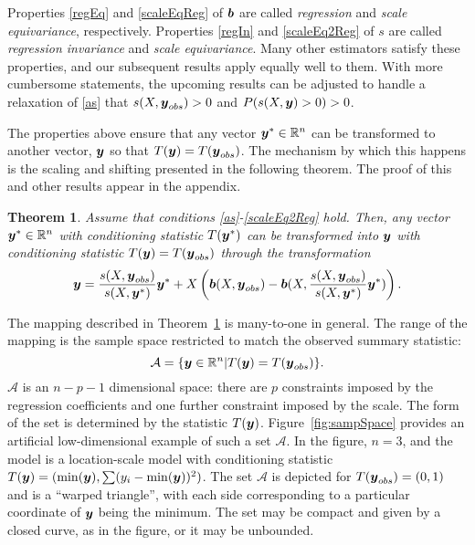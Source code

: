 \documentclass[12pt]{article}
\newcommand{\by}{\mbox{\boldmath $y$}}
\newcommand{\bb}{\mbox{\boldmath $b$}}
\newtheorem{theorem}{Theorem}[section]
\begin{document}
Properties \ref{regEq} and \ref{scaleEqReg} of $\bb$ are called
\textit{regression} and \textit{scale equivariance},
respectively.  Properties \ref{regIn} and \ref{scaleEq2Reg} of $s$ are called \textit{regression invariance}
and \textit{scale equivariance}. 
Many other estimators satisfy these properties, and our subsequent results apply equally
well to them.  With more cumbersome statements, the upcoming results can be adjusted to handle 
a relaxation of \ref{as} that 
$s(X,\by_{obs}) > 0$ and $P(s(X,\by)>0)>0$.  

The properties above ensure that any vector $\by^{*} \in \mathbb{R}^n$ can be transformed to another vector, 
$\by$ so that $T(\by) = T(\by_{obs})$.  The mechanism by which this happens is the scaling
and shifting presented in the following theorem.  The proof of this and other results appear in the appendix.  
\begin{theorem}
\label{Transformation}
Assume that conditions \ref{as}-\ref{scaleEq2Reg} hold.  Then, any vector $\by^* \in \mathbb{R}^n$ with conditioning statistic
$T(\by^*)$ can be transformed into $\by$ with conditioning statistic $T(\by) = T(\by_{obs})$
through the transformation 
\[
\by = \frac{s(X,\by_{obs})}{s(X,\by^*)} \by^* + X\left(\bb(X,\by_{obs}) - \bb(X,\frac{s(X,\by_{obs})}{s(X,\by^*)} \by^*)\right) .  
\]
\end{theorem}

The mapping described in Theorem~\ref{Transformation} is many-to-one
in general.
The range of the mapping is the sample space restricted to match
the observed summary statistic:
\begin{equation}
\label{sampleSpace}
 \mathcal{A}=\{\by\in \mathbb{R}^n | T(\by)=T(\by_{obs})\}.
\end{equation}
$\mathcal{A}$ is an $n - p - 1$ dimensional space: 
there are $p$ constraints imposed by the regression coefficients and one further constraint imposed by the scale.  
The form of the set is determined by the statistic $T(\by)$.  Figure~\ref{fig:sampSpace} 
provides an artificial low-dimensional
example of such a set $\mathcal{A}$.  In the figure, $n = 3$, and the model is a location-scale model with conditioning
statistic $T(\by)=(\min(\by), \sum (y_i - \min(\by))^2)$. The set $\mathcal{A}$ is depicted  for $T(\by_{obs})=(0,1)$ and is a ``warped triangle'', with each side
corresponding to a particular coordinate of $\by$ being the minimum.  The set may be compact and given by a closed curve, 
as in the figure, or it may be unbounded.  
\end{document}

